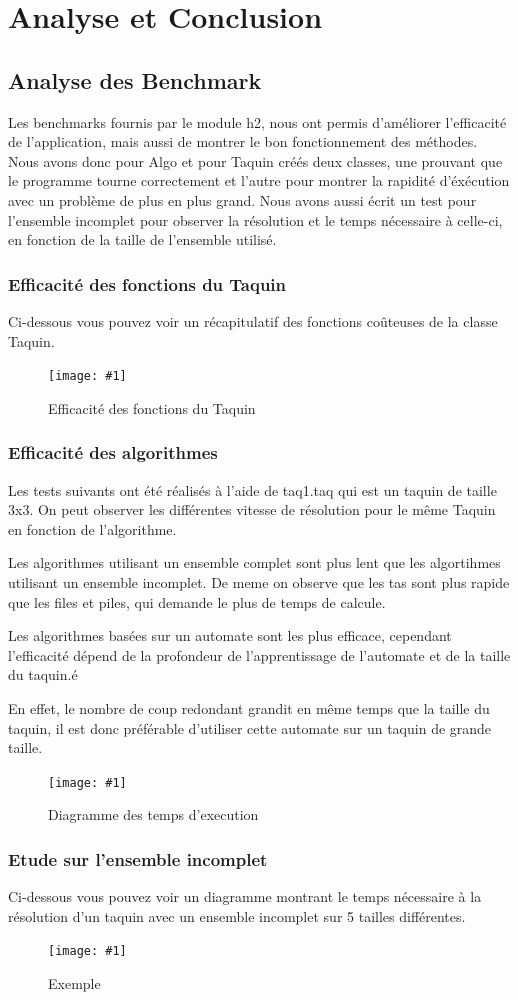 ﻿\documentclass[a4paper,twoside,12pt]{report}
\newcommand{\monimage}[4]{
\par\noindent
\begin{figure}[H] %
\begin{center}
\texttt{[image: \#1]} %
\caption{#2} %
\label{#3} %
\end{center}
\end{figure} %
}
\newcommand{\ml}[0]{\par\noindent}
\begin{document}
\chapter{Analyse et Conclusion}
%
\section{Analyse des Benchmark}
%
\par
Les benchmarks fournis par le module h2, nous ont permis d'am\'eliorer l'efficacit\'e de l'application, mais aussi de montrer le bon fonctionnement des m\'ethodes.
Nous avons donc pour Algo et pour Taquin cr\'e\'es deux classes, une prouvant que le programme tourne correctement et l'autre pour montrer la rapidit\'e d'\'ex\'ecution
avec un probl\`eme de plus en plus grand. Nous avons aussi \'ecrit un test pour l'ensemble incomplet pour observer la r\'esolution et le temps n\'ecessaire \`a celle-ci, en
fonction de la taille de l'ensemble utilis\'e.
%
\subsection{Efficacit\'e des fonctions du Taquin}
%
Ci-dessous vous pouvez voir un r\'ecapitulatif des fonctions co\^uteuses de la classe Taquin.
\monimage{taquinSpeed.png}{Efficacit\'e des fonctions du Taquin}{Eff}{0.6}
%
\subsection{Efficacit\'e des algorithmes}
Les tests suivants ont \'et\'e r\'ealis\'es \`a l'aide de taq1.taq qui est un taquin de taille 3x3. On peut observer les diff\'erentes vitesse de r\'esolution pour le m\^eme Taquin en fonction de
l'algorithme.
\ml
Les algorithmes utilisant un ensemble complet sont plus lent que les algortihmes utilisant un ensemble incomplet. De meme on observe que les tas sont plus rapide que les
files et piles, qui demande le plus de temps de calcule.
\ml
Les algorithmes bas\'ees sur un automate sont les plus efficace, cependant l'efficacit\'e d\'epend de la profondeur de l'apprentissage de l'automate et de la taille du taquin.\'e
\ml
 En effet, le nombre de coup redondant grandit en m\^eme temps que la taille du taquin, il est donc pr\'ef\'erable d'utiliser cette automate sur un taquin de grande taille.
\monimage{algoSpeed.png}{Diagramme des temps d'execution}{tempsExec}{0.6}

\subsection{Etude sur l'ensemble incomplet}
Ci-dessous vous pouvez voir un diagramme montrant le temps n\'ecessaire \`a la r\'esolution d'un taquin avec un ensemble incomplet sur 5 tailles diff\'erentes.
\monimage{ensembleincomplettest2.pdf}{Exemple}{EX}{0.6}
\end{document}
